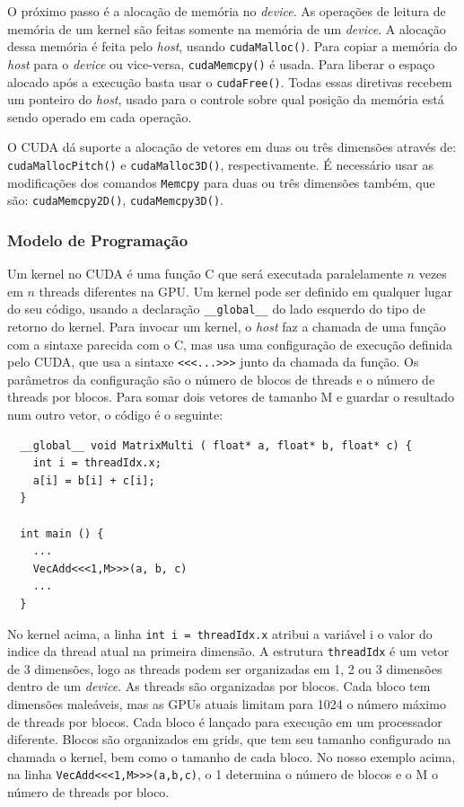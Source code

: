 O próximo passo é a alocação de memória no \textit{device}. As operações de leitura de memória de um kernel são feitas somente
na memória de um \textit{device}. A alocação dessa memória é feita pelo \textit{host}, usando \verb#cudaMalloc()#. 
Para copiar a memória do \textit{host} para o \textit{device} ou vice-versa,
\verb#cudaMemcpy()# é usada. Para liberar o espaço alocado após a execução basta usar o \verb#cudaFree()#.
Todas essas diretivas recebem um ponteiro do \textit{host}, usado para o controle sobre qual posição da memória está sendo
operado em cada operação.

O CUDA dá suporte a alocação de vetores em duas ou três dimensões através de: \verb#cudaMallocPitch()# e 
\verb#cudaMalloc3D()#, respectivamente. É necessário usar as modificações dos comandos \verb#Memcpy# para
duas ou três dimensões também, que são: \verb#cudaMemcpy2D()#, \verb#cudaMemcpy3D()#.

\subsubsection{Modelo de Programação}
Um kernel no CUDA é uma função C que será executada paralelamente $n$ vezes em $n$ threads diferentes na GPU. Um kernel pode ser
definido em qualquer lugar do seu código, usando a declaração \verb#__global__# do lado esquerdo do tipo de retorno do kernel.
Para invocar um kernel, o \textit{host} faz a chamada de uma função com a sintaxe parecida com o C, mas usa uma configuração de
execução definida pelo CUDA, que usa a sintaxe \verb#<<<...>>># junto da chamada da função. Os parâmetros da configuração são
o número de blocos de threads e o número de threads por blocos. Para somar dois vetores de tamanho M e guardar o resultado num
outro vetor, o código é o seguinte:

\begin{lstlisting}
  __global__ void MatrixMulti ( float* a, float* b, float* c) { 
    int i = threadIdx.x;
    a[i] = b[i] + c[i];        
  }
                            
  int main () {               
    ...                       
    VecAdd<<<1,M>>>(a, b, c)  
    ...                       
  }                                 
\end{lstlisting}

No kernel acima, a linha \verb#int i = threadIdx.x# atribui a variável i o valor do indice da thread atual na primeira dimensão. 
A estrutura \verb#threadIdx# é um vetor de 3 dimensões, logo as threads podem ser organizadas em 1, 2 ou 3 dimensões dentro de um
\textit{device}. As threads são organizadas por blocos. Cada bloco tem dimensões maleáveis, mas as GPUs atuais limitam para 1024 o 
número máximo de threads por blocos. Cada bloco é lançado para execução em um processador diferente. Blocos são organizados em 
grids, que tem seu tamanho configurado na chamada o kernel, bem como o tamanho de cada bloco. No nosso exemplo acima, na linha
\verb#VecAdd<<<1,M>>>(a,b,c)#, o 1 determina o número de blocos e o M o número de threads por bloco.

